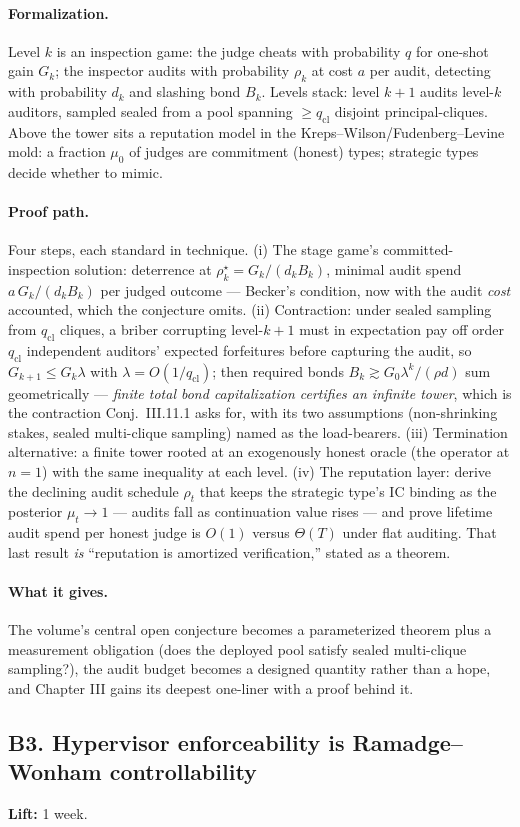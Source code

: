 \documentclass[11pt,a4paper]{article}
\newcommand{\lift}[1]{\noindent\textbf{Lift:} #1.}
\newcommand{\gives}{\paragraph{What it gives.}}
\newcommand{\form}{\paragraph{Formalization.}}
\newcommand{\proofpath}{\paragraph{Proof path.}}
\begin{document}
\form Level $k$ is an inspection game: the judge cheats with probability $q$ for one-shot gain $G_k$; the inspector audits with probability $\rho_k$ at cost $a$ per audit, detecting with probability $d_k$ and slashing bond $B_k$. Levels stack: level $k{+}1$ audits level-$k$ auditors, sampled sealed from a pool spanning $\ge q_{\mathrm{cl}}$ disjoint principal-cliques. Above the tower sits a reputation model in the Kreps--Wilson/Fudenberg--Levine mold: a fraction $\mu_0$ of judges are commitment (honest) types; strategic types decide whether to mimic.

\proofpath Four steps, each standard in technique. (i) The stage game's committed-inspection solution: deterrence at $\rho_k^\star = G_k/(d_k B_k)$, minimal audit spend $a\,G_k/(d_k B_k)$ per judged outcome --- Becker's condition, now with the audit \emph{cost} accounted, which the conjecture omits. (ii) Contraction: under sealed sampling from $q_{\mathrm{cl}}$ cliques, a briber corrupting level-$k{+}1$ must in expectation pay off order $q_{\mathrm{cl}}$ independent auditors' expected forfeitures before capturing the audit, so $G_{k+1} \le G_k\lambda$ with $\lambda = O(1/q_{\mathrm{cl}})$; then required bonds $B_k \gtrsim G_0\lambda^k/(\rho d)$ sum geometrically --- \emph{finite total bond capitalization certifies an infinite tower}, which is the contraction Conj.~III.11.1 asks for, with its two assumptions (non-shrinking stakes, sealed multi-clique sampling) named as the load-bearers. (iii) Termination alternative: a finite tower rooted at an exogenously honest oracle (the operator at $n{=}1$) with the same inequality at each level. (iv) The reputation layer: derive the declining audit schedule $\rho_t$ that keeps the strategic type's IC binding as the posterior $\mu_t \to 1$ --- audits fall as continuation value rises --- and prove lifetime audit spend per honest judge is $O(1)$ versus $\Theta(T)$ under flat auditing. That last result \emph{is} ``reputation is amortized verification,'' stated as a theorem.

\gives The volume's central open conjecture becomes a parameterized theorem plus a measurement obligation (does the deployed pool satisfy sealed multi-clique sampling?), the audit budget becomes a designed quantity rather than a hope, and Chapter III gains its deepest one-liner with a proof behind it.

\subsection{B3. Hypervisor enforceability is Ramadge--Wonham controllability}
\lift{1 week}
\end{document}
